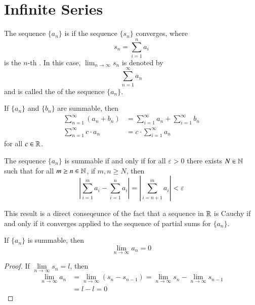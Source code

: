 \documentclass[12pt, a4paper, oneside, openright, titlepage]{book}
\begin{document}
\section{Infinite Series}

\begin{defn}
    The sequence $\{a_n\}$ is  if the sequence $\{s_n\}$ converges, where \begin{equation*}
        s_n = \sum\limits_{i=1}^na_i
    \end{equation*}
    is the $n$-th . In this case, $\lim_{n\rightarrow \infty}s_n$ is denoted by \begin{equation*}
        \sum\limits_{n=1}^{\infty}a_n
    \end{equation*}
    and is called the  of the sequence $\{a_n\}$.
\end{defn}

\begin{rmk}
    If $\{a_n\}$ and $\{b_n\}$ are summable, then \begin{align*}
        \sum\limits_{n=1}^{\infty}(a_n+b_n) &= \sum\limits_{i=1}^{\infty}a_n + \sum\limits_{i=1}^{\infty}b_n \\
        \sum\limits_{n=1}^{\infty}c\cdot a_n &= c\cdot\sum\limits_{i=1}^{\infty}a_n
    \end{align*}
    for all $c \in \mathbb R$. 
\end{rmk}

\begin{namthm}\label{thmname:cauchcrit}
    The sequence $\{a_n\}$ is summable if and only if for all $\varepsilon > 0$ there exists $N \in \mathbb N$ such that for all $m \geq n \in \mathbb N$, if $m,n \geq N$, then \begin{equation*}
        \left|\sum\limits_{i=1}^ma_i - \sum\limits_{i=1}^na_i\right| = \left|\sum\limits_{i=n+1}^ma_i\right| <\varepsilon
    \end{equation*}
\end{namthm}

\begin{rmk}
    This result is a direct conseqeunce of the fact that a sequence in $\mathbb R$ is Cauchy if and only if it converges applied to the sequence of partial sums for $\{a_n\}$.
\end{rmk}


\begin{namthm}
    If $\{a_n\}$ is summable, then \begin{equation*}
        \lim\limits_{n\rightarrow \infty}a_n = 0
    \end{equation*}
\end{namthm}
\begin{proof}
    If $\lim\limits_{n\rightarrow \infty}s_n = l$, then \begin{align*}
        \lim\limits_{n\rightarrow \infty}a_n &= \lim\limits_{n\rightarrow \infty}(s_n - s_{n-1}) = \lim\limits_{n\rightarrow \infty}s_n - \lim\limits_{n\rightarrow \infty}s_{n-1} \\
        &= l - l = 0
    \end{align*}
\end{proof}
\end{document}
